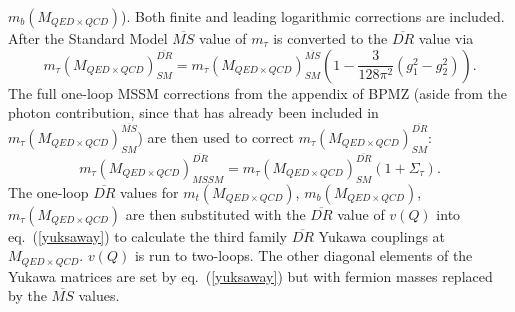 \documentclass{article}
\begin{document}
$m_b(M_{QED \times QCD})$).
Both finite and leading logarithmic
corrections are included.
After the Standard Model $\overline{MS}$ value of $m_\tau$ is converted to the
$\overline{DR}$ value via
\begin{equation}
m_\tau(M_{QED \times QCD})^{\overline{DR}}_{SM} = m_\tau(M_{QED \times QCD})^{\overline{MS}}_{SM}
\left( 1 - \frac{3}{128 \pi^2} (g_1^2 - g_2^2)\right).
\end{equation}
The full one-loop MSSM corrections from the appendix 
of BPMZ 
(aside from the photon
contribution, since that has already been included in
$m_\tau(M_{QED \times QCD})^{\overline{MS}}_{SM}$) 
are then used to correct
$m_\tau(M_{QED \times QCD})^{\overline{DR}}_{SM}$:
\begin{equation}
m_\tau(M_{QED \times QCD})^{\overline{DR}}_{MSSM} = m_\tau(M_{QED \times QCD})^{\overline{DR}}_{SM}
 (1 + \Sigma_\tau).
\end{equation}
The one-loop $\overline{DR}$ values for $m_t(M_{QED \times QCD})$, $m_b(M_{QED \times QCD})$,
$m_{\tau}(M_{QED \times QCD})$ are then substituted with the $\overline{DR}$ value
of $v(Q)$ into eq.~(\ref{yuksaway}) to calculate the third family
$\overline{DR}$ Yukawa couplings at $M_{QED \times QCD}$.
$v(Q)$ is run to two-loops.
The other diagonal elements of the Yukawa matrices are set by
eq.~(\ref{yuksaway}) but with fermion masses replaced by the $\overline{MS}$
values. 
\end{document}
